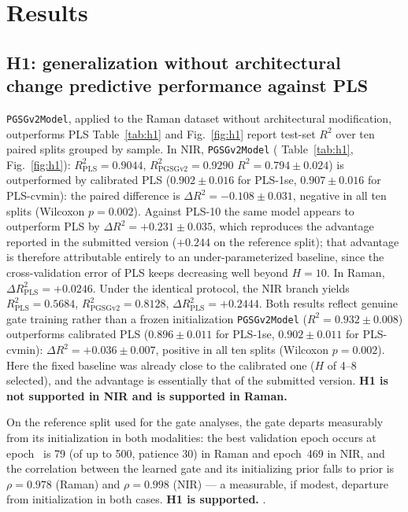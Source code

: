 \documentclass[preprint,12pt]{elsarticle}
\providecommand{\DIFaddtex}[1]{{\protect\color{blue} \sf #1}} %
\providecommand{\DIFdeltex}[1]{{\protect\color{red} \scriptsize #1}} %
\providecommand{\DIFaddbegin}{} %
\providecommand{\DIFaddend}{} %
\providecommand{\DIFdelbegin}{} %
\providecommand{\DIFdelend}{} %
\providecommand{\DIFadd}[1]{\texorpdfstring{\DIFaddtex{#1}}{#1}} %
\providecommand{\DIFdel}[1]{\texorpdfstring{\DIFdeltex{#1}}{}} %
\providecommand{\DIFscaledelfig}{0.5}
\newlength{\DIFdelgraphicswidth} %
\newlength{\DIFdelgraphicsheight} %
\providecommand{\DIFaddincludegraphics}[2][]{{\color{blue}\fbox{\DIFOincludegraphics[#1]{#2}}}} %
\providecommand{\DIFdelincludegraphics}[2][]{%
\sbox{\DIFdelgraphicsbox}{\DIFOincludegraphics[#1]{#2}}%
\settoboxwidth{\DIFdelgraphicswidth}{\DIFdelgraphicsbox} %
\settoboxtotalheight{\DIFdelgraphicsheight}{\DIFdelgraphicsbox} %
\scalebox{\DIFscaledelfig}{%
\parbox[b]{\DIFdelgraphicswidth}{\usebox{\DIFdelgraphicsbox}\\[-\baselineskip] \rule{\DIFdelgraphicswidth}{0em}}\llap{\resizebox{\DIFdelgraphicswidth}{\DIFdelgraphicsheight}{%
\setlength{\unitlength}{\DIFdelgraphicswidth}%
\begin{picture}(1,1)%
\thicklines\linethickness{2pt} %
{\color[rgb]{1,0,0}\put(0,0){\framebox(1,1){}}}%
{\color[rgb]{1,0,0}\put(0,0){\line( 1,1){1}}}%
{\color[rgb]{1,0,0}\put(0,1){\line(1,-1){1}}}%
\end{picture}%
}\hspace*{3pt}}} %
} %
\DeclareRobustCommand{\DIFaddbegin}{\DIFOaddbegin \let\includegraphics\DIFaddincludegraphics} %
\DeclareRobustCommand{\DIFaddend}{\DIFOaddend \let\includegraphics\DIFOincludegraphics} %
\DeclareRobustCommand{\DIFdelbegin}{\DIFOdelbegin \let\includegraphics\DIFdelincludegraphics} %
\DeclareRobustCommand{\DIFdelend}{\DIFOaddend \let\includegraphics\DIFOincludegraphics} %
\begin{document}
\DIFaddend \section{Results}
\label{sec:results}

\subsection{H1: \DIFdelbegin \DIFdel{generalization without architectural change}\DIFdelend \DIFaddbegin \DIFadd{predictive performance against PLS}\DIFaddend }
\label{sec:results-h1}

\DIFdelbegin \DIFdel{\texttt{PGSGv2Model}, applied to the Raman dataset without architectural modification, outperforms PLS }\DIFdelend \DIFaddbegin \DIFadd{Table~\ref{tab:h1} and Fig.~\ref{fig:h1} report test-set $R^{2}$ over ten paired splits grouped by sample. In NIR, \texttt{PGSGv2Model} }\DIFaddend (\DIFdelbegin \DIFdel{Table~\ref{tab:h1}, Fig.~\ref{fig:h1}): $R^{2}_{\mathrm{PLS}}=0.9044$, $R^{2}_{\mathrm{PGSGv2}}=0.9290$}\DIFdelend \DIFaddbegin \DIFadd{$R^{2}=0.794\pm0.024$) is outperformed by calibrated PLS ($0.902\pm0.016$ for PLS-1se, $0.907\pm0.016$ for PLS-cvmin): the paired difference is $\Delta R^{2}=-0.108\pm0.031$, negative in all ten splits (Wilcoxon $p=0.002$). Against PLS-10 the same model appears to outperform PLS by $\Delta R^{2}=+0.231\pm0.035$, which reproduces the advantage reported in the submitted version ($+0.244$ on the reference split); that advantage is therefore attributable entirely to an under-parameterized baseline, since the cross-validation error of PLS keeps decreasing well beyond $H=10$. In Raman}\DIFaddend , \DIFdelbegin \DIFdel{$\Delta R^{2}_{\mathrm{PLS}}=+0.0246$. Under the identical protocol, the NIR branch yields $R^{2}_{\mathrm{PLS}}=0.5684$, $R^{2}_{\mathrm{PGSGv2}}=0.8128$, $\Delta R^{2}_{\mathrm{PLS}}=+0.2444$. Both results reflect genuine gate training rather than a frozen initialization }\DIFdelend \DIFaddbegin \DIFadd{\texttt{PGSGv2Model} ($R^{2}=0.932\pm0.008$) outperforms calibrated PLS ($0.896\pm0.011$ for PLS-1se, $0.902\pm0.011$ for PLS-cvmin): $\Delta R^{2}=+0.036\pm0.007$, positive in all ten splits (Wilcoxon $p=0.002$). Here the fixed baseline was already close to the calibrated one ($H$ of 4--8 selected), and the advantage is essentially that of the submitted version. \textbf{H1 is not supported in NIR and is supported in Raman.}
}

\DIFadd{On the reference split used for the gate analyses, the gate departs measurably from its initialization in both modalities}\DIFaddend : the best validation epoch \DIFdelbegin \DIFdel{occurs at epoch~}\DIFdelend \DIFaddbegin \DIFadd{is }\DIFaddend 79 (of up to 500, patience 30) in Raman and \DIFdelbegin \DIFdel{epoch~}\DIFdelend 469 in NIR, and the correlation between \DIFdelbegin \DIFdel{the }\DIFdelend learned gate and \DIFdelbegin \DIFdel{its initializing prior falls to }\DIFdelend \DIFaddbegin \DIFadd{prior is }\DIFaddend $\rho=0.978$ (Raman) and $\rho=0.998$ (NIR)\DIFdelbegin \DIFdel{--- a measurable, if modest, departure from initialization in both cases.
\textbf{H1 is supported.}
}\DIFdelend \DIFaddbegin \DIFadd{.
}\DIFaddend 
\end{document}
